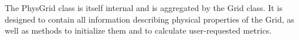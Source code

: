 %


The PhysGrid class is itself internal and is aggregated by the Grid
class.  It is designed to contain all information describing physical
properties of the Grid, as well as methods to initialize them and to
calculate user-requested metrics.

